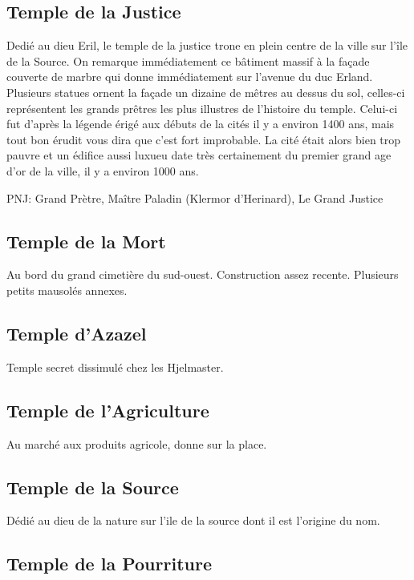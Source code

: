 \subsection{Temple de la Justice}

Dedié au dieu Eril, le temple de la justice trone en plein centre de la ville sur l'île de la Source.
On remarque immédiatement ce bâtiment massif à la façade couverte de marbre qui donne immédiatement
sur l'avenue du duc Erland. Plusieurs statues ornent la façade un dizaine de mêtres au dessus du sol,
celles-ci représentent les grands prêtres les plus illustres de l'histoire du temple. Celui-ci fut 
d'après la légende érigé aux débuts de la cités il y a environ 1400 ans, mais tout bon érudit vous
dira que c'est fort improbable. La cité était alors bien trop pauvre et un édifice aussi luxueu date très 
certainement du premier grand age d'or de la ville, il y a environ 1000 ans.

PNJ: Grand Prètre, Maître Paladin (Klermor d'Herinard), Le Grand Justice

\subsection{Temple de la Mort}

Au bord du grand cimetière du sud-ouest. Construction assez recente. Plusieurs petits mausolés annexes.

\subsection{Temple d'Azazel}

Temple secret dissimulé chez les Hjelmaster.

\subsection{Temple de l'Agriculture}

Au marché aux produits agricole, donne sur la place.

\subsection{Temple de la Source}

Dédié au dieu de la nature sur l'ile de la source dont il est l'origine du nom.

\subsection{Temple de la Pourriture}

